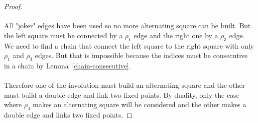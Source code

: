 \begin{proof}
\begin{figure}[H]
  \begin{center}
    \caption{}
  \end{center}
\end{figure}

\paragraph{}
All "joker" edges have been used so no more alternating square can be built. But the left square must be connected by a $\rho_1$ edge and the right one by a $\rho_3$ edge. We need to find a chain that connect the left square to the right square with only $\rho_1$ and $\rho_3$ edges. But that is impossible because the indices must be consecutive in a chain by Lemma~\ref{chain-consecutive}.

\paragraph{}
Therefore one of the involution must build an alternating square and the other must build a double edge and link two fixed points. By duality, only the case where $\rho_4$ makes an alternating square will be considered and the other makes a double edge and links two fixed points.


\end{proof}
